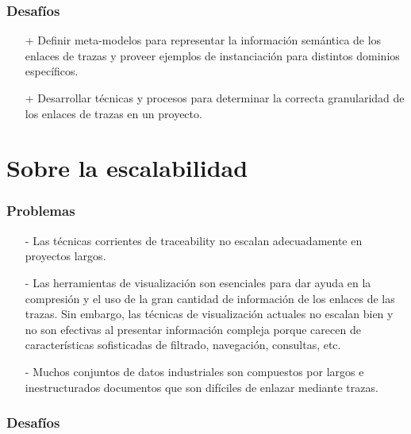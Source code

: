 \documentclass[a4paper,12pt,oneside]{book}
\begin{document}
\subsubsection{Desafíos}

\begin{itemize}

\item[+]     Definir meta-modelos para representar la información semántica de los enlaces de trazas y proveer ejemplos de instanciación para distintos dominios específicos.

\item[+]    Desarrollar técnicas y procesos para determinar la correcta granularidad de los enlaces de trazas en un proyecto.

\end{itemize}

\section{Sobre la escalabilidad}

\subsubsection{Problemas}

\begin{itemize}

\item[-]     Las técnicas corrientes de traceability no escalan adecuadamente en proyectos largos.

\item[-]    Las herramientas de visualización son esenciales para dar ayuda en la compresión y el uso de la gran cantidad de información de los enlaces de las trazas. Sin embargo, las técnicas de visualización actuales no escalan bien y no son efectivas al presentar información compleja porque carecen de características sofisticadas de filtrado, navegación, consultas, etc.

\item[-]    Muchos conjuntos de datos industriales son compuestos por largos e inestructurados documentos que son difíciles de enlazar mediante trazas.
\end{itemize}

\subsubsection{Desafíos}
\end{document}
